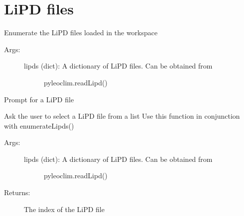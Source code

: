 \documentclass[letterpaper,10pt,english]{sphinxmanual}
\begin{document}
\section{LiPD files}
\label{\detokenize{LipdUtils:lipd-files}}

\begin{fulllineitems}
\label{\detokenize{LipdUtils:pyleoclim.LipdUtils.enumerateLipds}}
Enumerate the LiPD files loaded in the workspace
\begin{description}
\item[{Args:}] \leavevmode\begin{description}
\item[{lipds (dict): A dictionary of LiPD files. Can be obtained from}] \leavevmode
pyleoclim.readLipd()

\end{description}

\end{description}

\end{fulllineitems}


\begin{fulllineitems}
\label{\detokenize{LipdUtils:pyleoclim.LipdUtils.getLipd}}
Prompt for a LiPD file

Ask the user to select a LiPD file from a list
Use this function in conjunction with enumerateLipds()
\begin{description}
\item[{Args:}] \leavevmode\begin{description}
\item[{lipds (dict): A dictionary of LiPD files. Can be obtained from}] \leavevmode
pyleoclim.readLipd()

\end{description}

\item[{Returns:}] \leavevmode
The index of the LiPD file

\end{description}

\end{fulllineitems}
\end{document}
